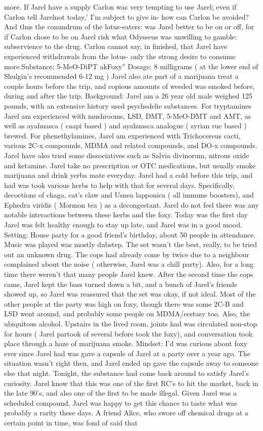 \documentclass[12pt]{book}
\begin{document}
more. If Jarel have a supply Carlon was very tempting to use Jarel; even if Carlon tell Jarelnot today,' I'm subject to give in- how can Carlon be avoided? And thus the conundrum of the lotus-eaters: was Jarel better to be on or off, for if Carlon chose to be on Jarel risk what Odysseus was unwilling to gamble: subservience to the drug. Carlon cannot say, in finished, that Jarel have experienced withdrawals from the lotus- only the strong desire to consume more.Substance: 5-MeO-DiPT akFoxy'' Dosage: 8 milligrams ( at the lower end of Shulgin's recommended 6-12 mg ) Jarel also ate part of a marijuana treat a couple hours before the trip, and copious amounts of weeded was smoked before, during and after the trip. Background: Jarel am a 26 year old male weighed 125 pounds, with an extensive history used psychedelic substances. For tryptamines Jarel am experienced with mushrooms, LSD, DMT, 5-MeO-DMT and AMT, as well as ayahuasca ( caapi based ) and ayahuasca analogue ( syrian rue based ) brewed. For phenethylamines, Jarel am experienced with Trichocereus cacti, various 2C-x compounds, MDMA and related compounds, and DO-x compounds. Jarel have also tried some dissociatives such as Salvia divinorum, nitrous oxide and ketamine. Jarel take no prescription or OTC medications, but usually smoke marijuana and drink yerba mate everyday. Jarel had a cold before this trip, and had was took various herbs to help with that for several days. Specifically, decoctions of chaga, cat's claw and Usnea lapponica ( all immune boosters), and Ephedra viridis ( Mormon tea ) as a decongestant. Jarel do not feel there was any notable interactions between these herbs and the foxy. Today was the first day Jarel was felt healthy enough to stay up late, and Jarel was in a good mood. Setting: House party for a good friend's birthday, about 50 people in attendance. Music was played was mostly dubstep. The set wasn't the best, really, to be tried out an unknown drug. The cops had already come by twice due to a neighbour complained about the noise ( otherwise, Jarel was a chill party). Also, for a long time there weren't that many people Jarel knew. After the second time the cops came, Jarel kept the bass turned down a bit, and a bunch of Jarel's friends showed up, so Jarel was reassured that the set was okay, if not ideal. Most of the other people at the party was high on foxy, though there was some 2C-B and LSD went around, and probably some people on MDMA/ecstasy too. Also, the ubiquitous alcohol. Upstairs in the lived room, joints had was circulated non-stop for hours ( Jarel partook of several before took the foxy), and conversation took place through a haze of marijuana smoke. Mindset: I'd was curious about foxy ever since Jarel had was gave a capsule of Jarel at a party over a year ago. The situation wasn't right then, and Jarel ended up gave the capsule away to someone else that night. Tonight, the substance had come back around to satisfy Jarel's curiosity. Jarel know that this was one of the first RC's to hit the market, back in the late 90's, and also one of the first to be made illegal. Given Jarel was a scheduled compound, Jarel was happy to get this chance to taste what was probably a rarity these days. A friend Alice, who swore off chemical drugs at a certain point in time, was fond of said that 
\end{document}
